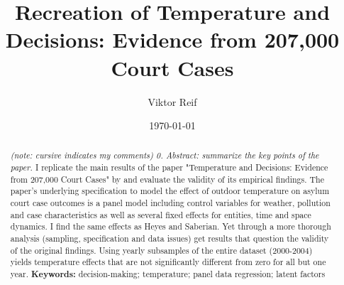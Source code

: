 \documentclass[11pt]{article}
\title{Recreation of Temperature and Decisions: Evidence from 207,000
	Court Cases}
\author{Viktor Reif}
\date{\today}
\begin{document}
	\maketitle
	
	
	\begin{abstract}
		\singlespacing
		\noindent 
		\textit{(note: cursive indicates my comments) 0. Abstract: summarize the key points of the paper.}
		I replicate the main results of the paper "Temperature and Decisions: Evidence from 207,000 Court Cases" by \cite{Heyes.2019} and evaluate the validity of its empirical findings. The paper's underlying specification to model the effect of outdoor temperature on asylum court case outcomes is a panel model including control variables for weather, pollution and case characteristics as well as several fixed effects for entities, time and space dynamics. I find the same effects as Heyes and Saberian. Yet through a more thorough analysis (sampling, specification and data issues) get results that question the validity of the original findings. Using yearly subsamples of the entire dataset (2000-2004) yields temperature effects that are not significantly different from zero for all but one year.
		\newline \noindent \textbf{Keywords:} decision-making; temperature; panel data regression; latent factors
	\end{abstract} \newpage

	
	
\end{document}
